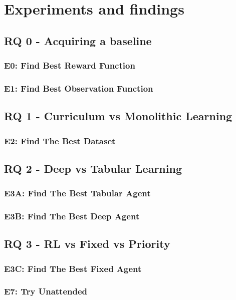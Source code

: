 \chapter{Experiments and findings}

\section{RQ 0 - Acquiring a baseline}
  \subsection{E0: Find Best Reward Function}
  \subsection{E1: Find Best Observation Function}

\section{RQ 1 - Curriculum vs Monolithic Learning}
  \subsection{E2: Find The Best Dataset}

\section{RQ 2 - Deep vs Tabular Learning}
  \subsection{E3A: Find The Best Tabular Agent}
  \subsection{E3B: Find The Best Deep Agent}

\section{RQ 3 - RL vs Fixed vs Priority}
  \subsection{E3C: Find The Best Fixed Agent}
  \subsection{E7: Try Unattended}

